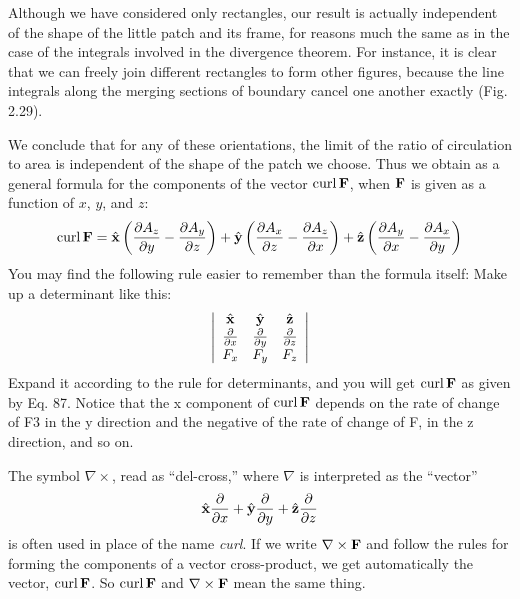 Although we have considered only rectangles, our result is actually
independent of the shape of the little patch and its frame, for reasons
much the same as in the case of the integrals involved in the divergence
theorem. For instance, it is clear that we can freely join different
rectangles to form other figures, because the line integrals
along the merging sections of boundary cancel one another exactly
(Fig. 2.29).

We conclude that for any of these orientations, the limit of the
ratio of circulation to area is independent of the shape of the patch
we choose. Thus we obtain as a general formula for the components
of the vector $\operatorname{curl}\mathbf{F}$, when $\mathbf{F}$ is given as a function of $x$, $y$, and $z$:
\begin{equation}
\operatorname{curl}\mathbf{F} = 
    \hat{\mathbf{x}}\left(\frac{\partial A_z}{\partial y}-\frac{\partial A_y}{\partial z}\right)
   +\hat{\mathbf{y}}\left(\frac{\partial A_x}{\partial z}-\frac{\partial A_z}{\partial x}\right)
   +\hat{\mathbf{z}}\left(\frac{\partial A_y}{\partial x}-\frac{\partial A_x}{\partial y}\right)
\end{equation}
You may find the following rule easier to remember than the formula
itself: Make up a determinant like this:
\begin{equation}
  \left|
    \begin{array}{ccc}
      \hat{\mathbf{x}} & \hat{\mathbf{y}} & \hat{\mathbf{z}} \\
      \frac{\partial}{\partial x} & \frac{\partial}{\partial y} & \frac{\partial}{\partial z} \\
      F_x & F_y & F_z
    \end{array}
  \right|
\end{equation}
Expand it according to the rule for determinants, and you will get
$\operatorname{curl}\mathbf{F}$ as given by Eq. 87. Notice that the x component of $\operatorname{curl}\mathbf{F}$
depends on the rate of change of F3 in the y direction and the negative
of the rate of change of F, in the z direction, and so on.

The symbol $\nabla \times$, read as ``del-cross,'' where $\nabla$ is interpreted as the
``vector''
\begin{equation}
  \hat{\mathbf{x}}\frac{\partial}{\partial x}
  +\hat{\mathbf{y}}\frac{\partial}{\partial y}
  +\hat{\mathbf{z}}\frac{\partial}{\partial z}
\end{equation}
is often used in place of the name \emph{curl}. If we write $\nabla\times\mathbf{F}$ and follow
the rules for forming the components of a vector cross-product, we
get automatically the vector, $\operatorname{curl}\mathbf{F}$. So $\operatorname{curl}\mathbf{F}$ and $\nabla\times\mathbf{F}$ mean the
same thing.

